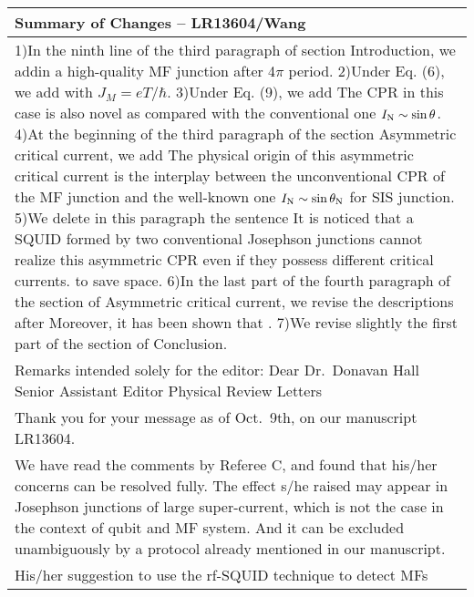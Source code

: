 \documentclass[11pt]{article}
\begin{document}
\begin{longtable}[]{@{}l@{}}
\toprule
\begin{minipage}[b]{0.96\columnwidth}\raggedright
Summary of Changes -- LR13604/Wang\strut
\end{minipage}\tabularnewline
\midrule
\endhead
\begin{minipage}[t]{0.96\columnwidth}\raggedright
1)In the ninth line of the third paragraph of section Introduction, we
addin a high-quality MF junction after 4\(\pi\) period. 2)Under Eq. (6),
we add with \(J_M = e{T}/{\hbar}\). 3)Under Eq. (9), we add The CPR in
this case is also novel as compared with the conventional one
\(I_{\rm N}\sim \sin\theta\). 4)At the beginning of the third paragraph
of the section Asymmetric critical current, we add The physical origin
of this asymmetric critical current is the interplay between the
unconventional CPR of the MF junction and the well-known one
\(I_{\rm N}\sim \sin\theta_{\rm N}\) for SIS junction. 5)We delete in
this paragraph the sentence It is noticed that a SQUID formed by two
conventional Josephson junctions cannot realize this asymmetric CPR even
if they possess different critical currents. to save space. 6)In the
last part of the fourth paragraph of the section of Asymmetric critical
current, we revise the descriptions after Moreover, it has been shown
that . 7)We revise slightly the first part of the section of
Conclusion.\strut
\end{minipage}\tabularnewline
\begin{minipage}[t]{0.96\columnwidth}\raggedright
Remarks intended solely for the editor: Dear Dr.~Donavan Hall Senior
Assistant Editor Physical Review Letters\strut
\end{minipage}\tabularnewline
\begin{minipage}[t]{0.96\columnwidth}\raggedright
Thank you for your message as of Oct.~9th, on our manuscript
LR13604.\strut
\end{minipage}\tabularnewline
\begin{minipage}[t]{0.96\columnwidth}\raggedright
We have read the comments by Referee C, and found that his/her concerns
can be resolved fully. The effect s/he raised may appear in Josephson
junctions of large super-current, which is not the case in the context
of qubit and MF system. And it can be excluded unambiguously by a
protocol already mentioned in our manuscript.\strut
\end{minipage}\tabularnewline
\begin{minipage}[t]{0.96\columnwidth}\raggedright
His/her suggestion to use the rf-SQUID technique to detect MFs

\end{minipage}
\end{longtable}
\end{document}
